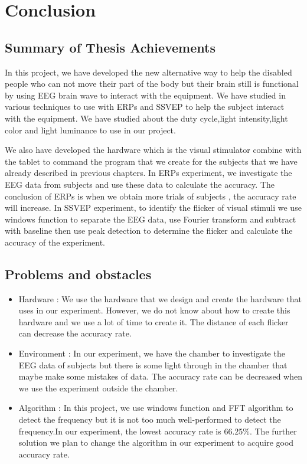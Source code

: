 \chapter{Conclusion}

\label{ch:conclusions}

\section{Summary of Thesis Achievements}

\hspace{1.5cm}
In this project, we have developed the new alternative way to help the disabled people who can not move their part of the body but their brain still is functional by using EEG brain wave to interact with the equipment. We have studied in various techniques to use with ERPs and SSVEP to help the subject interact with the equipment. We have studied about the duty cycle,light intensity,light color and light luminance to use in our project.\par
We also have developed the hardware which is the visual stimulator combine with the tablet to command the program that we create for the subjects that we have already described in previous chapters. In ERPs experiment, we investigate the EEG data from subjects and use these data to calculate the accuracy. The conclusion of ERPs is when we obtain more trials of subjects , the accuracy rate will increase. In SSVEP experiment, to identify the flicker of visual stimuli we use windows function to separate the EEG data, use Fourier transform and subtract with baseline then use peak detection to determine the flicker and calculate the accuracy of the experiment.

\newpage
\section{Problems and obstacles}
\begin{itemize}
\item Hardware : We use the hardware that we design and create the hardware that uses in our experiment. However, we do not know about how to create this hardware and we use a lot of time to create it. The distance of each flicker can decrease the accuracy rate.

\item Environment : In our experiment, we have the chamber to investigate the EEG data of subjects but there is some light through in the chamber that maybe make some mistakes of data. The accuracy rate can be decreased when we use the experiment outside the chamber.

\item Algorithm : In this project, we use windows function and FFT algorithm to detect the frequency but it is not too much well-performed to detect the frequency.In our experiment, the lowest accuracy rate is 66.25\%. The further solution we plan to change the algorithm in our experiment to acquire good accuracy rate.
\end{itemize}

